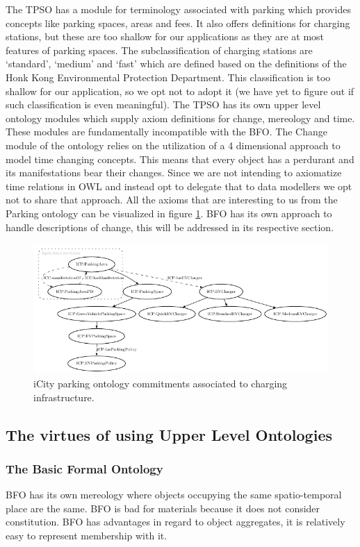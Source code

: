 The TPSO has a module for terminology associated with parking which provides
concepts like parking spaces, areas and fees. It also offers definitions for
charging stations, but these are too shallow for our applications as they are
at most features of parking spaces. The subclassification of charging stations
are `standard', `medium' and `fast' which are defined based on the definitions
of the Honk Kong Environmental Protection Department. This classification is
too shallow for our application, so we opt not to adopt it (we have yet to
figure out if such classification is even meaningful). The TPSO has its own
upper level ontology modules which supply axiom definitions for change,
mereology and time. These modules are fundamentally incompatible with the BFO.
The Change module of the ontology relies on the utilization of a 4 dimensional
approach to model time changing concepts. This means that every object has a
perdurant and its manifestations bear their changes. Since we are not intending
to axiomatize time relations in OWL and instead opt to delegate that to data
modellers we opt not to share that approach. All the axioms that are
interesting to us from the Parking ontology can be visualized in figure
\ref{parkingfig}. BFO has its own approach to handle descriptions of change,
this will be addressed in its respective section.

\begin{figure}[h]
    \centering
    \includegraphics[width=1.0\textwidth]{images/PARKING}
    \caption{iCity parking ontology commitments associated to charging infrastructure.}
    \label{parkingfig}
\end{figure}

\subsection{The virtues of using Upper Level Ontologies}
\label{upperlevel}


\subsubsection{The Basic Formal Ontology}

BFO has its own mereology where objects occupying the same spatio-temporal place
are the same. BFO is bad for materials because it does not consider constitution.
BFO has advantages in regard to object aggregates, it is relatively easy to represent
membership with it. 

